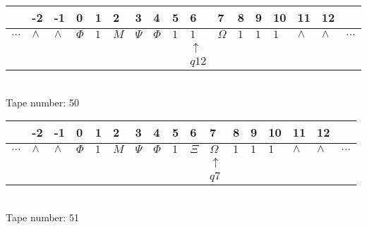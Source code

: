 \documentclass{article}
\begin{document}
\begin{table}[H]
\centering
\begin{tabular}{lllllllllllllllll}
 & -2 & -1 & 0 & 1 & 2 & 3 & 4 & 5 & 6 & 7 & 8 & 9 & 10 & 11 & 12 & \\
\hline
$...$ & \multicolumn{1}{|l|}{$\wedge$} & \multicolumn{1}{|l|}{$\wedge$} & \multicolumn{1}{|l|}{$\Phi$} & \multicolumn{1}{|l|}{$1$} & \multicolumn{1}{|l|}{$M$} & \multicolumn{1}{|l|}{$\Psi$} & \multicolumn{1}{|l|}{$\Phi$} & \multicolumn{1}{|l|}{$1$} & \multicolumn{1}{|l|}{$1$} & \multicolumn{1}{|l|}{$\Omega$} & \multicolumn{1}{|l|}{$1$} & \multicolumn{1}{|l|}{$1$} & \multicolumn{1}{|l|}{$1$} & \multicolumn{1}{|l|}{$\wedge$} & \multicolumn{1}{|l|}{$\wedge$} & $...$\\
\hline
&  &  &  &  &  &  &  &  & $\uparrow$ &  &  &  &  &  &  &  \\
&  &  &  &  &  &  &  &  & $ q12 $ &  &  &  &  &  &  &  \\
\end{tabular}
\\
Tape number: 50
\noindent\makebox[\linewidth]{\hdashrule{\textwidth}{1pt}{1pt}}\end{table}

\begin{table}[H]
\centering
\begin{tabular}{lllllllllllllllll}
 & -2 & -1 & 0 & 1 & 2 & 3 & 4 & 5 & 6 & 7 & 8 & 9 & 10 & 11 & 12 & \\
\hline
$...$ & \multicolumn{1}{|l|}{$\wedge$} & \multicolumn{1}{|l|}{$\wedge$} & \multicolumn{1}{|l|}{$\Phi$} & \multicolumn{1}{|l|}{$1$} & \multicolumn{1}{|l|}{$M$} & \multicolumn{1}{|l|}{$\Psi$} & \multicolumn{1}{|l|}{$\Phi$} & \multicolumn{1}{|l|}{$1$} & \multicolumn{1}{|l|}{$\Xi$} & \multicolumn{1}{|l|}{$\Omega$} & \multicolumn{1}{|l|}{$1$} & \multicolumn{1}{|l|}{$1$} & \multicolumn{1}{|l|}{$1$} & \multicolumn{1}{|l|}{$\wedge$} & \multicolumn{1}{|l|}{$\wedge$} & $...$\\
\hline
&  &  &  &  &  &  &  &  &  & $\uparrow$ &  &  &  &  &  &  \\
&  &  &  &  &  &  &  &  &  & $ q7 $ &  &  &  &  &  &  \\
\end{tabular}
\\
Tape number: 51
\noindent\makebox[\linewidth]{\hdashrule{\textwidth}{1pt}{1pt}}\end{table}
\end{document}
